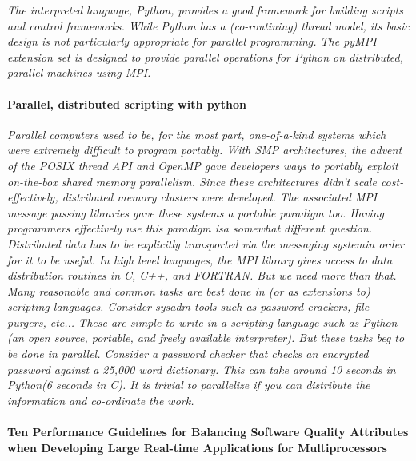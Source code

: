 \documentclass{article}
\begin{document}
\emph{The interpreted language, Python, provides a good framework for building
scripts and control frameworks. While Python has a (co-routining) thread model,
its basic design is not particularly appropriate for parallel programming. The
pyMPI extension set is designed to provide parallel operations for Python on
distributed, parallel machines using MPI.}

\paragraph{Parallel, distributed scripting with python} \cite{millerparallel}

\emph{Parallel computers used to be, for the most part, one-of-a-kind systems
which were extremely difficult to program portably. With SMP architectures, the
advent of the POSIX thread API and OpenMP gave developers ways to portably
exploit on-the-box shared memory parallelism. Since these architectures
didn't scale cost-effectively, distributed memory clusters were developed. The
associated MPI message passing libraries gave these systems a portable paradigm
too. Having programmers effectively use this paradigm isa somewhat different
question. Distributed data has to be explicitly transported via the messaging
systemin order for it to be useful. In high level languages, the MPI library
gives access to data distribution routines in C, C++, and FORTRAN. But we need
more than that. Many reasonable and common tasks are best done in (or as
extensions to) scripting languages. Consider sysadm tools such as password
crackers, file purgers, etc... These are simple to write in a scripting
language such as Python (an open source, portable, and freely available
interpreter). But these tasks beg to be done in parallel. Consider a
password checker that checks an encrypted password against a 25,000 word
dictionary. This can take around 10 seconds in Python(6 seconds in C). It is
trivial to parallelize if you can distribute the information and co-ordinate
the work.}

\paragraph{Ten Performance Guidelines for Balancing Software Quality Attributes
when Developing Large Real-time Applications for Multiprocessors}
\cite{haggander1999guidelines}
\end{document}
